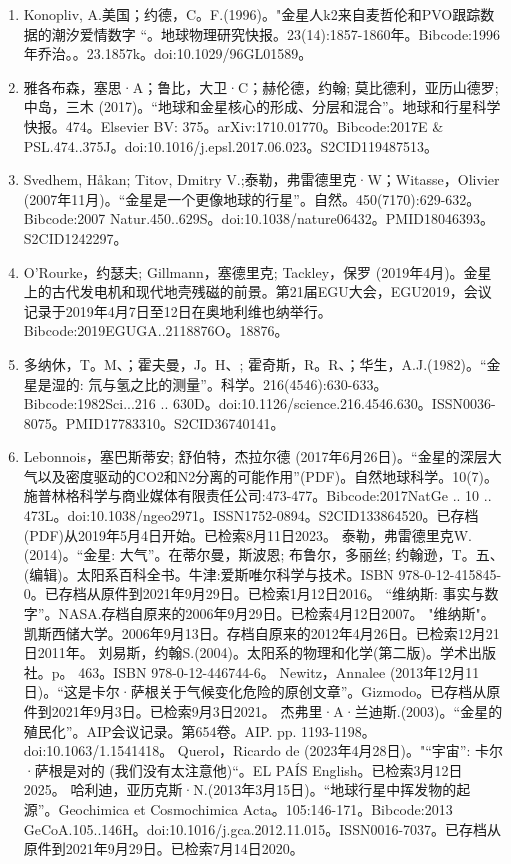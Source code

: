 \begin{enumerate}
\item Konopliv, A.美国；约德，C。F.(1996)。"金星人k2来自麦哲伦和PVO跟踪数据的潮汐爱情数字 “。地球物理研究快报。23(14):1857-1860年。Bibcode:1996年乔治。。23.1857k。doi:10.1029/96GL01589。
\item 雅各布森，塞思·A；鲁比，大卫·C；赫伦德，约翰; 莫比德利，亚历山德罗; 中岛，三木 (2017)。“地球和金星核心的形成、分层和混合”。地球和行星科学快报。474。Elsevier BV: 375。arXiv:1710.01770。Bibcode:2017E & PSL.474..375J。doi:10.1016/j.epsl.2017.06.023。S2CID119487513。 
\item Svedhem, Håkan; Titov, Dmitry V.;泰勒，弗雷德里克·W；Witasse，Olivier (2007年11月)。“金星是一个更像地球的行星”。自然。450(7170):629-632。Bibcode:2007 Natur.450..629S。doi:10.1038/nature06432。PMID18046393。S2CID1242297。  
\item O'Rourke，约瑟夫; Gillmann，塞德里克; Tackley，保罗 (2019年4月)。金星上的古代发电机和现代地壳残磁的前景。第21届EGU大会，EGU2019，会议记录于2019年4月7日至12日在奥地利维也纳举行。Bibcode:2019EGUGA..2118876O。18876。
\item 多纳休，T。M、；霍夫曼，J。H、; 霍奇斯，R。R、；华生，A.J.(1982)。“金星是湿的: 氘与氢之比的测量”。科学。216(4546):630-633。Bibcode:1982Sci...216 .. 630D。doi:10.1126/science.216.4546.630。ISSN0036-8075。PMID17783310。S2CID36740141。   
\item Lebonnois，塞巴斯蒂安; 舒伯特，杰拉尔德 (2017年6月26日)。“金星的深层大气以及密度驱动的CO2和N2分离的可能作用”(PDF)。自然地球科学。10(7)。施普林格科学与商业媒体有限责任公司:473-477。Bibcode:2017NatGe .. 10 .. 473L。doi:10.1038/ngeo2971。ISSN1752-0894。S2CID133864520。已存档(PDF)从2019年5月4日开始。已检索8月11日2023。   
 泰勒，弗雷德里克W.(2014)。“金星: 大气”。在蒂尔曼，斯波恩; 布鲁尔，多丽丝; 约翰逊，T。五、 (编辑)。太阳系百科全书。牛津:爱斯唯尔科学与技术。ISBN 978-0-12-415845-0。已存档从原件到2021年9月29日。已检索1月12日2016。
 “维纳斯: 事实与数字”。NASA.存档自原来的2006年9月29日。已检索4月12日2007。
 "维纳斯"。凯斯西储大学。2006年9月13日。存档自原来的2012年4月26日。已检索12月21日2011年。
 刘易斯，约翰S.(2004)。太阳系的物理和化学(第二版)。学术出版社。p。 463。ISBN 978-0-12-446744-6。
 Newitz，Annalee (2013年12月11日)。“这是卡尔·萨根关于气候变化危险的原创文章”。Gizmodo。已存档从原件到2021年9月3日。已检索9月3日2021。
 杰弗里·A·兰迪斯.(2003)。“金星的殖民化”。AIP会议记录。第654卷。AIP. pp. 1193-1198。doi:10.1063/1.1541418。
 Querol，Ricardo de (2023年4月28日)。"“宇宙”: 卡尔·萨根是对的 (我们没有太注意他)“。EL PAÍS English。已检索3月12日2025。
 哈利迪，亚历克斯·N.(2013年3月15日)。“地球行星中挥发物的起源”。Geochimica et Cosmochimica Acta。105:146-171。Bibcode:2013 GeCoA.105..146H。doi:10.1016/j.gca.2012.11.015。ISSN0016-7037。已存档从原件到2021年9月29日。已检索7月14日2020。 

\end{enumerate}
